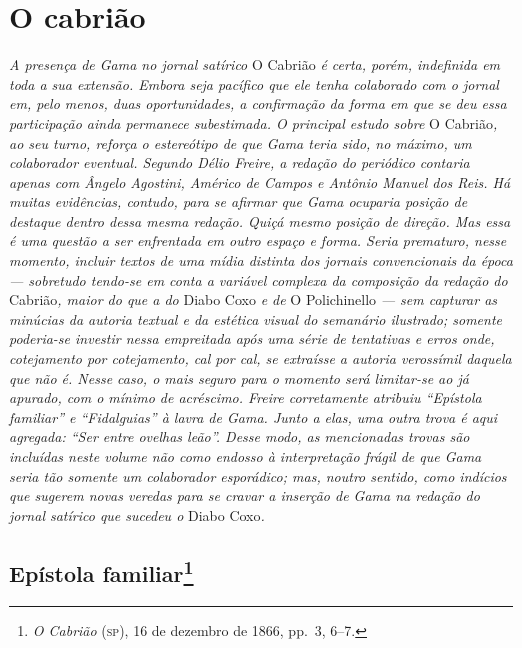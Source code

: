 
\part{O cabrião} %

\begin{argumento}
\emph{A presença de Gama no jornal satírico} O Cabrião \emph{é certa,
porém, indefinida em toda a sua extensão. Embora seja pacífico que ele
tenha colaborado com o jornal em, pelo menos, duas oportunidades, a
confirmação da forma em que se deu essa participação ainda permanece
subestimada. O principal estudo sobre} O Cabrião\emph{, ao seu turno,
reforça o estereótipo de que Gama teria sido, no máximo, um colaborador
eventual. Segundo Délio Freire, a redação do periódico contaria apenas
com Ângelo Agostini, Américo de Campos e Antônio Manuel dos Reis. Há
muitas evidências, contudo, para se afirmar que Gama ocuparia posição de
destaque dentro dessa mesma redação. Quiçá mesmo posição de direção. Mas
essa é uma questão a ser enfrentada em outro espaço e forma. Seria
prematuro, nesse momento, incluir textos de uma mídia distinta dos
jornais convencionais da época --- sobretudo tendo-se em conta a variável
complexa da composição da redação do} Cabrião\emph{, maior do que a do}
Diabo Coxo \emph{e de} O Polichinello \emph{--- sem capturar as minúcias
da autoria textual e da estética visual do semanário ilustrado; somente
poderia-se investir nessa empreitada após uma série de tentativas e
erros onde, cotejamento por cotejamento, cal por cal, se extraísse a
autoria verossímil daquela que não é. Nesse caso, o mais seguro para o
momento será limitar-se ao já apurado, com o mínimo de acréscimo. Freire
corretamente atribuiu ``Epístola familiar'' e ``Fidalguias'' à lavra de Gama.
Junto a elas, uma outra trova é aqui agregada: ``Ser entre ovelhas leão''.
Desse modo, as mencionadas trovas são incluídas neste volume não como
endosso à interpretação frágil de que Gama seria tão somente um
colaborador esporádico; mas, noutro sentido, como indícios que sugerem
novas veredas para se cravar a inserção de Gama na redação do jornal
satírico que sucedeu o} Diabo Coxo\emph{.}
\end{argumento}

\chapter{Epístola familiar\footnote{\emph{O Cabrião} (\textsc{sp}), 16 de dezembro de 1866, pp.~3, 6--7.}} %

